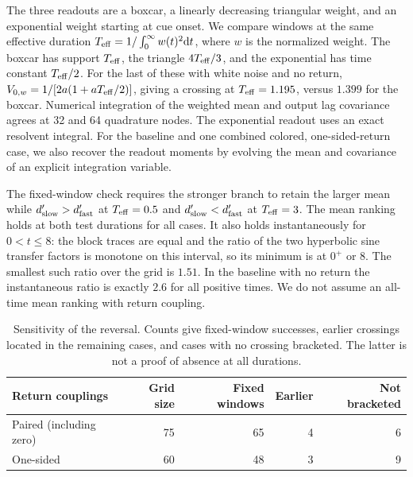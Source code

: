 \documentclass[aps,10pt,onecolumn,superscriptaddress,nofootinbib,
  longbibliography,amsmath,amssymb,floatfix]{revtex4-2}
\newcommand{\dd}{\mathrm{d}}
\begin{document}
The three readouts are a boxcar, a linearly decreasing triangular
weight, and an exponential weight starting at cue onset.
We compare windows at the same effective duration
\(T_{\rm eff}=1/\int_0^\infty w(t)^2\dd t\), where \(w\) is the
normalized weight. The boxcar has support \(T_{\rm eff}\), the
triangle \(4T_{\rm eff}/3\), and the exponential has time constant
\(T_{\rm eff}/2\). For the last of these with white noise and no
return, \(V_{0,w}=1/[2a(1+a T_{\rm eff}/2)]\), giving a crossing
at \(T_{\rm eff}=1.195\), versus \(1.399\) for the boxcar.
Numerical integration of the weighted mean and output lag
covariance agrees at 32 and 64 quadrature nodes. The
exponential readout uses an exact resolvent integral.
For the baseline and one combined colored, one-sided-return
case, we also recover the readout moments by evolving the
mean and covariance of an explicit integration variable.

The fixed-window check requires the stronger branch to retain
the larger mean while \(d'_{\rm slow}>d'_{\rm fast}\) at
\(T_{\rm eff}=0.5\) and \(d'_{\rm slow}<d'_{\rm fast}\) at
\(T_{\rm eff}=3\). The mean ranking holds at both test durations
for all cases. It also holds instantaneously for \(0<t\le8\):
the block traces are equal and the ratio of the two hyperbolic
sine transfer factors is monotone on this interval, so its
minimum is at \(0^+\) or \(8\). The smallest such ratio
over the grid is \(1.51\). In the baseline with no return the
instantaneous ratio is exactly \(2.6\) for all positive times.
We do not assume an all-time mean ranking with return coupling.

\begin{table}[ht]
\caption{\label{tab:crossover}Sensitivity of the reversal.
Counts give fixed-window successes, earlier crossings located
in the remaining cases, and cases with no crossing bracketed.
The latter is not a proof of absence at all durations.}
\begin{ruledtabular}
\begin{tabular}{lrrrr}
Return couplings & Grid size & Fixed windows & Earlier & Not bracketed\\
\hline
Paired (including zero) & 75 & 65 & 4 & 6\\
One-sided & 60 & 48 & 3 & 9\\
\end{tabular}
\end{ruledtabular}
\end{table}
\end{document}
